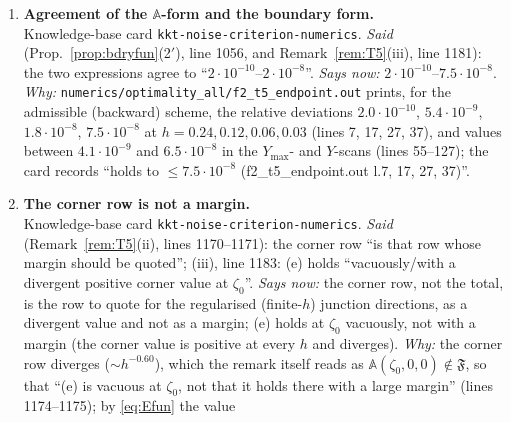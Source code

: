 \documentclass[11pt]{article}
\newcommand{\Aop}{\mathbb A}
\begin{document}
\begin{enumerate}[label=C\arabic*,ref=C\arabic*,leftmargin=2.4em,itemsep=3pt]
 Knowledge-base card \texttt{kkt-noise-sign-criterion}.
 \emph{Said} (\S\ref{sec:f2}, item~5, line 1325): the commutator $-[Q,\zeta_0]$ ``returns
 only solver noise (Prop.~\ref{prop:bdryfun}(2$'$))''.
 \emph{Says now:} it carries no information about $\mathcal E$: it is not merely solver noise
 but $O(1)$ and worse on the finer scans.
 \emph{Why:} Prop.~\ref{prop:bdryfun}(2$'$), which the line cites, reports the F2 T5 values
 $-9.1\cdot10^{-6}$, $+1.9\cdot10^{-4}$, $-9.9\cdot10^{-3}$, $+7.4\cdot10^{-2}$ at
 $h=0.24,0.12,0.06,0.03$, other rungs reaching $-63$ and $-1.6\cdot10^6$, and says that the
 expression ``is not merely small noise, it is $O(1)$ and worse on the finer scans''; the card
 records the same values (``O(1), no information on the true $2\lambda(1-\theta)g_Q$'').
\item\label{corr0924:C7} \textbf{Agreement of the $\Aop$-form and the boundary form.}\\
 Knowledge-base card \texttt{kkt-noise-criterion-numerics}.
 \emph{Said} (Prop.~\ref{prop:bdryfun}(2$'$), line 1056, and Remark~\ref{rem:T5}(iii),
 line 1181): the two expressions agree to ``$2\cdot10^{-10}$--$2\cdot10^{-8}$''.
 \emph{Says now:} $2\cdot10^{-10}$--$7.5\cdot10^{-8}$.
 \emph{Why:} \texttt{numerics/optimality\_all/f2\_t5\_endpoint.out} prints, for the
 admissible (backward) scheme, the relative deviations $2.0\cdot10^{-10}$,
 $5.4\cdot10^{-9}$, $1.8\cdot10^{-8}$, $7.5\cdot10^{-8}$ at $h=0.24,0.12,0.06,0.03$ (lines 7,
 17, 27, 37), and values between $4.1\cdot10^{-9}$ and $6.5\cdot10^{-8}$ in the $Y_{\max}$-
 and $Y$-scans (lines 55--127); the card records ``holds to $\le7.5\cdot10^{-8}$
 (f2\_t5\_endpoint.out l.7, 17, 27, 37)''.
\item\label{corr0924:C8} \textbf{The corner row is not a margin.}\\
 Knowledge-base card \texttt{kkt-noise-criterion-numerics}.
 \emph{Said} (Remark~\ref{rem:T5}(ii), lines 1170--1171): the corner row ``is that row whose
 margin should be quoted''; (iii), line 1183: (e) holds ``vacuously/with a divergent positive
 corner value at $\zeta_0$''.
 \emph{Says now:} the corner row, not the total, is the row to quote for the regularised
 (finite-$h$) junction directions, as a divergent value and not as a margin; (e) holds at
 $\zeta_0$ vacuously, not with a margin (the corner value is positive at every $h$ and
 diverges).
 \emph{Why:} the corner row diverges ($\sim h^{-0.60}$), which the remark itself reads as
 $\Aop(\zeta_0,0,0)\notin\mathfrak F$, so that ``(e) is vacuous at $\zeta_0$, not that it
 holds there with a large margin'' (lines 1174--1175); by \eqref{eq:Efun} the value

\end{enumerate}
\end{document}
